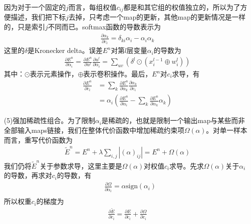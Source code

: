             \par
            因为对于一个固定的$j$而言，每组权值$c_{ij}$都是和其它组的权值独立的，所以为了方便描述，我们把下标$j$去掉，只考虑一个map的更新，其他map的更新情况是一样的，只是索引$j$不同而已。softmax函数的导数表示为
            \begin{align*}
            \frac{\partial \alpha_k}{\partial c_i} = \delta_{ki}\alpha_i - \alpha_i\alpha_k
            \end{align*}
            这里的$\delta$是Kronecker delta。误差$E^n$对第$l$层变量$\alpha_i$的导数为
            \begin{align*}
            \frac{\partial E^n }{\partial \alpha_i} = \frac{\partial E^n}{\partial u^l} \frac{\partial u^l}{\partial \alpha_i} = \sum_{uv} \left( \delta ^l\odot(x_i^{l-1}\oplus w_i^l)  \right)
            \end{align*}
            其中：$\odot$表示元素操作，$\oplus$表示卷积操作。最后，$E^n$对$c_i$求导，有
            \begin{align*}
            \frac{\partial E^n}{\partial c_i} &= \sum_k \frac{\partial E^n}{\partial \alpha_k}\frac{\partial \alpha_k}{\partial c_i}\\
            &=\alpha_i \left( \frac{\partial E^n}{\partial \alpha_i} - \sum_{k}\frac{\partial E^n}{\partial \alpha_k}\alpha_k \right)
            \end{align*}
            \par
            (5)强加稀疏性组合。为了限制$\alpha_i$是稀疏的，也就是限制一个输出map与某些而非全部输入maps链接，我们在整体代价函数中增加稀疏约束项$\Omega(\alpha)$。对单一样本而言，重写代价函数为
            \begin{align*}
            \tilde{E}^n = E^n + \lambda \sum_{i,j} |(\alpha)_{ij}| = E^n + \Omega(\alpha)
            \end{align*}
            我们仍将$\tilde{E}^n$关于参数求导，这里主要是$\Omega(\alpha)$对权值$c_i$求导。先求$\Omega(\alpha)$关于$\alpha_i$的导数，再求对$c_i$的导数，有
            \begin{align*}
            & \frac{\partial \Omega}{\partial \alpha_i} = \alpha \mathrm{sign}(\alpha_i)\\
            \end{align*}
            所以权重$c_i$的梯度为
            \begin{align*}
            \frac{\partial \tilde{E}}{\partial c_i} = \frac{\partial E}{\partial c_i} + \frac{\partial \Omega }{\partial c_i}
            \end{align*}
